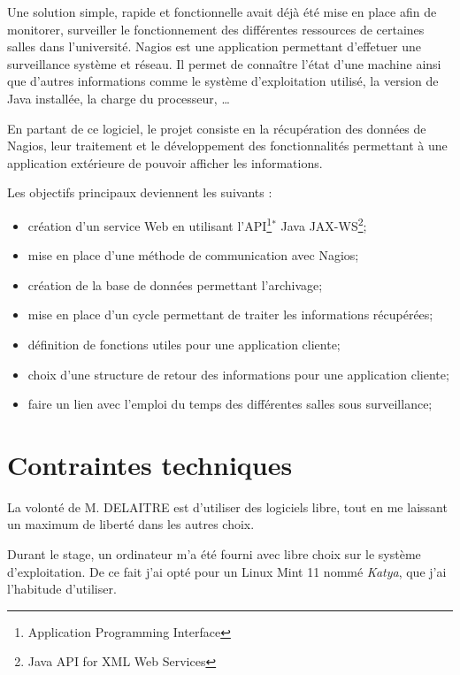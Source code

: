 Une solution simple, rapide et fonctionnelle avait d\'ej\`a \'et\'e mise en place afin de \og{}monitorer\fg{}, \cad{} surveiller le fonctionnement des diff\'erentes ressources de certaines salles dans l'universit\'e.
Nagios est une application permettant d'effetuer une surveillance syst\`eme et r\'eseau.
Il permet de conna\^itre l'\'etat d'une machine ainsi que d'autres informations comme le syst\`eme d'exploitation utilis\'e, la version de Java install\'ee, la charge du processeur, \ldots

En partant de ce logiciel, le projet consiste en la r\'ecup\'eration des donn\'ees de Nagios, leur traitement et le d\'eveloppement des fonctionnalit\'es permettant \`a une application ext\'erieure de pouvoir afficher les informations.

\noindent Les objectifs principaux deviennent les suivants :

\begin{itemize}
	\item cr\'eation d'un service Web en utilisant l'API\protect\footnote{Application Programming Interface}$^*$ Java JAX-WS\protect\footnote{Java API for XML Web Services};
	\item mise en place d'une m\'ethode de communication avec Nagios;
	\item cr\'eation de la base de donn\'ees permettant l'archivage;
	\item mise en place d'un cycle permettant de traiter les informations r\'ecup\'er\'ees;
	\item d\'efinition de fonctions utiles pour une application cliente;
	\item choix d'une structure de retour des informations pour une application cliente;
	\item faire un lien avec l'emploi du temps des diff\'erentes salles sous surveillance;

\end{itemize}

\section{Contraintes techniques}

La volont\'e de M. DELAITRE est d'utiliser des logiciels libre, tout en me laissant un maximum de libert\'e dans les autres choix.

Durant le stage, un ordinateur m'a \'et\'e fourni avec libre choix sur le syst\`eme d'exploitation.
De ce fait j'ai opt\'e pour un Linux Mint 11 nomm\'e \textit{Katya}, que j'ai l'habitude d'utiliser.

